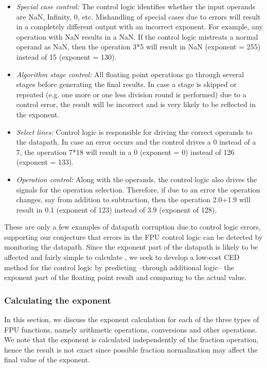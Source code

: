 \documentclass[12pt]{yalephd}
\begin{document}
\begin{itemize}
\item {\em Special case control:} The control logic identifies whether the input operands are NaN, Infinity, 0, etc. Mishandling of special cases due to errors will result in a completely different output with an incorrect exponent. For example, any operation with NaN results in a NaN. If the control logic mistreats a normal operand as NaN, then the operation 3*5 will result in NaN (exponent = 255) instead of 15 (exponent = 130).

\item {\em Algorithm stage control:} All floating point operations go through several stages before generating the final results. In case a stage is skipped or repeated (e.g. one more or one less division round is performed) due to a control error, the result will be incorrect and is very likely to be reflected in the exponent.

\item {\em Select lines:} Control logic is responsible for driving the correct operands to the datapath. In case an error occurs and the control drives a 0 instead of a 7, the operation 7*18 will result in a 0 (exponent = 0) instead of 126 (exponent = 133).

\item {\em Operation control:} Along with the operands, the control logic also drives the signals for the operation selection. Therefore, if due to an error the operation changes, say from addition to subtraction, then the operation 2.0+1.9 will result in 0.1 (exponent of 123) instead of 3.9 (exponent of 128).
\end{itemize}

These are only a few examples of datapath corruption due to control logic errors, supporting our conjecture that errors in the FPU control logic can be detected by monitoring the datapath. Since the exponent part of the datapath is likely to be affected and fairly simple to calculate \cite{Go91}, we seek to develop a low-cost CED method for the control logic by predicting --through additional logic-- the exponent part of the floating point result and comparing to the actual value.

\subsubsection{Calculating the exponent}\label{sC3sFPU_exp}

In this section, we discuss the exponent calculation for each of the three types of FPU functions, namely arithmetic operations, conversions and other operations. We note that the exponent is calculated independently of the fraction operation, hence the result is not exact since possible fraction normalization may affect the final value of the exponent.
\end{document}
